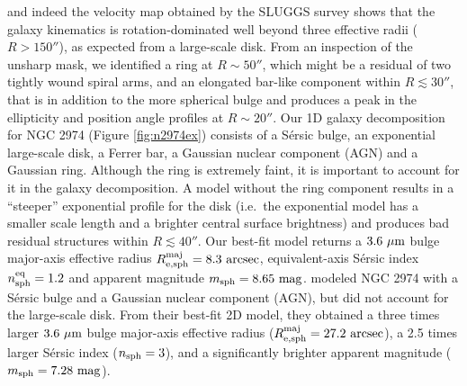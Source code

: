 \documentclass[preprint2]{emulateapj}
\begin{document}
and indeed the velocity map obtained by the SLUGGS survey shows that the galaxy kinematics is rotation-dominated 
well beyond three effective radii ($R>150''$), 
as expected from a large-scale disk. 
From an inspection of the unsharp mask, we identified a ring at $R \sim 50''$, 
which might be a residual of two tightly wound spiral arms,
and an elongated bar-like component within $R \lesssim 30''$,
that is in addition to the more spherical bulge 
and produces a peak in the ellipticity and position angle profiles at $R \sim 20''$.
Our 1D galaxy decomposition for NGC 2974 (Figure \ref{fig:n2974ex}) consists of a S\'ersic bulge, an exponential large-scale disk,
a Ferrer bar, a Gaussian nuclear component (AGN) and a Gaussian ring.
Although the ring is extremely faint, it is important to account for it in the galaxy decomposition. 
A model without the ring component results in a ``steeper'' exponential profile for the disk 
(i.e.~the exponential model has a smaller scale length and a brighter central surface brightness) 
and produces bad residual structures within $R \lesssim 40''$.
Our best-fit model returns a $3.6~\rm \mu m$ bulge major-axis effective radius $R_{\rm e,sph}^{\rm maj} = 8.3\rm~arcsec$, 
equivalent-axis S\'ersic index $n_{\rm sph}^{\rm eq} = 1.2$ and apparent magnitude $m_{\rm sph} = 8.65~\rm mag$.
\cite{sani2011} modeled NGC 2974 with a S\'ersic bulge and a Gaussian nuclear component (AGN), 
but did not account for the large-scale disk.
From their best-fit 2D model, they obtained a three times larger 
$3.6~\rm \mu m$ bulge major-axis effective radius ($R_{\rm e,sph}^{\rm maj} = 27.2\rm~arcsec$), 
a 2.5 times larger S\'ersic index ($n_{\rm sph} = 3$),
and a significantly brighter apparent magnitude ($m_{\rm sph} = 7.28~\rm mag$).
\end{document}
